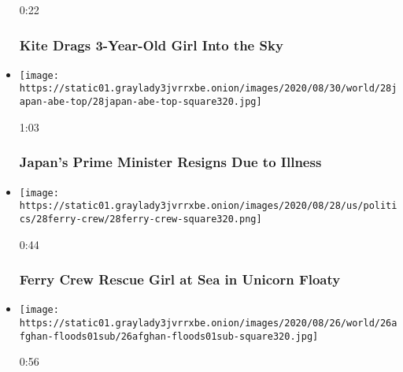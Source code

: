 \begin{itemize}
  0:22

  \hypertarget{kite-drags-3-year-old-girl-into-the-sky}{%
  \subsubsection{Kite Drags 3-Year-Old Girl Into the
  Sky}\label{kite-drags-3-year-old-girl-into-the-sky}}
\item
  \href{https://www.nytimes3xbfgragh.onion/video/us/100000007313110/japan-prime-minister-shinzo-abe-resigns-video.html?action=click\&module=video-series-bar\&region=header\&pgtype=Article\&playlistId=video/world}{}

  \texttt{[image: https://static01.graylady3jvrrxbe.onion/images/2020/08/30/world/28japan-abe-top/28japan-abe-top-square320.jpg]}

  1:03

  \hypertarget{japans-prime-minister-resigns-due-to-illness}{%
  \subsubsection{Japan's Prime Minister Resigns Due to
  Illness}\label{japans-prime-minister-resigns-due-to-illness}}
\item
  \href{https://www.nytimes3xbfgragh.onion/video/us/politics/100000007313169/greece-rescue-lost-girl-unicorn-floaty.html?action=click\&module=video-series-bar\&region=header\&pgtype=Article\&playlistId=video/world}{}

  \texttt{[image: https://static01.graylady3jvrrxbe.onion/images/2020/08/28/us/politics/28ferry-crew/28ferry-crew-square320.png]}

  0:44

  \hypertarget{ferry-crew-rescue-girl-at-sea-in-unicorn-floaty}{%
  \subsubsection{Ferry Crew Rescue Girl at Sea in Unicorn
  Floaty}\label{ferry-crew-rescue-girl-at-sea-in-unicorn-floaty}}
\item
  \href{https://www.nytimes3xbfgragh.onion/video/us/100000007308896/afghan-floods-video.html?action=click\&module=video-series-bar\&region=header\&pgtype=Article\&playlistId=video/world}{}

  \texttt{[image: https://static01.graylady3jvrrxbe.onion/images/2020/08/26/world/26afghan-floods01sub/26afghan-floods01sub-square320.jpg]}

  0:56


\end{itemize}
